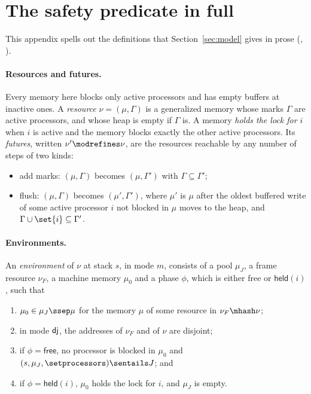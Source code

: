 \FloatBarrier
\section{The safety predicate in full}
\label{app:safety}

This appendix spells out the definitions that Section~\ref{sec:model} gives
in prose (, ).

\paragraph{Resources and futures.}
Every memory here blocks only active processors and has empty buffers at
inactive ones. A \emph{resource} $\nu = (\mu,\Gamma)$ is a generalized
memory whose marks $\Gamma$ are active processors, and whose heap is empty
if $\Gamma$ is. A memory \emph{holds the lock for $i$} when $i$ is active
and the memory blocks exactly the other active processors. Its \emph{futures}, written $\nu' \modrefines \nu$, are the
resources reachable by any number of steps of two kinds:
\begin{itemize}[nosep]
  \item add marks: $(\mu,\Gamma)$ becomes $(\mu,\Gamma')$ with
        $\Gamma \subseteq \Gamma'$;
  \item flush: $(\mu,\Gamma)$ becomes $(\mu',\Gamma')$, where $\mu'$ is
        $\mu$ after the oldest buffered write of some active processor $i$
        not blocked in $\mu$ moves to the heap, and
        $\Gamma \cup \set{i} \subseteq \Gamma'$.
\end{itemize}

\paragraph{Environments.}
An \emph{environment} of $\nu$ at stack $s$, in mode $m$, consists of a
pool $\mu_J$, a frame resource $\nu_F$, a machine memory $\mu_0$ and a
phase $\phi$, which is either \textsf{free} or $\textsf{held}(i)$, such
that
\begin{enumerate}[nosep]
  \item $\mu_0 \in \mu_J \ssep \mu$ for the memory $\mu$ of some resource in
        $\nu_F \mhash \nu$;
  \item in mode $\mathsf{dj}$, the addresses of $\nu_F$ and of $\nu$ are
        disjoint;
  \item if $\phi = \textsf{free}$, no processor is blocked in $\mu_0$ and
        $(s,\mu_J,\setprocessors) \sentails J$; and
  \item if $\phi = \textsf{held}(i)$, $\mu_0$ holds the lock for $i$, and
        $\mu_J$ is empty.
\end{enumerate}

